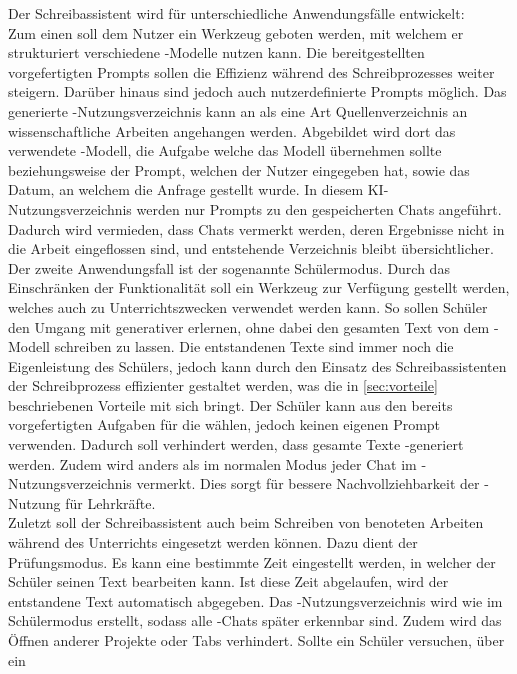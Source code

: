 \documentclass[../main.tex]{subfiles}
\begin{document}
Der Schreibassistent wird für unterschiedliche Anwendungsfälle entwickelt: \\
Zum einen soll dem Nutzer ein Werkzeug geboten werden, mit welchem er strukturiert verschiedene -Modelle nutzen kann. Die bereitgestellten vorgefertigten Prompts sollen die 
Effizienz während des Schreibprozesses weiter steigern. Darüber hinaus sind jedoch auch nutzerdefinierte Prompts möglich. Das generierte -Nutzungsverzeichnis kann an als eine Art 
Quellenverzeichnis an wissenschaftliche Arbeiten angehangen werden. Abgebildet wird dort das verwendete -Modell, die Aufgabe welche das Modell 
übernehmen sollte beziehungsweise der Prompt, welchen der Nutzer eingegeben hat, sowie das Datum, an welchem die Anfrage gestellt wurde. In diesem KI-Nutzungsverzeichnis werden nur 
Prompts zu den gespeicherten Chats angeführt. Dadurch wird vermieden, dass Chats vermerkt werden, deren Ergebnisse nicht in die Arbeit eingeflossen sind, und entstehende Verzeichnis 
bleibt übersichtlicher.\\ 
Der zweite Anwendungsfall ist der sogenannte Schülermodus. Durch das Einschränken der Funktionalität soll ein Werkzeug zur Verfügung gestellt werden, welches auch zu 
Unterrichtszwecken verwendet werden kann. So sollen Schüler den Umgang mit generativer  erlernen, ohne dabei den gesamten Text von dem -Modell schreiben zu lassen. Die 
entstandenen Texte sind immer noch die Eigenleistung des Schülers, jedoch kann durch den Einsatz des Schreibassistenten der Schreibprozess effizienter gestaltet werden, was die in 
\autoref{sec:vorteile} beschriebenen Vorteile mit sich bringt. Der Schüler kann aus den bereits vorgefertigten Aufgaben für die  wählen, jedoch keinen eigenen Prompt verwenden. Dadurch soll 
verhindert werden, dass gesamte Texte -generiert werden. Zudem wird anders als im normalen Modus jeder Chat im -Nutzungsverzeichnis vermerkt. Dies sorgt für bessere 
Nachvollziehbarkeit der -Nutzung für Lehrkräfte.\\ 
Zuletzt soll der Schreibassistent auch beim Schreiben von benoteten Arbeiten während des Unterrichts eingesetzt werden können. Dazu dient der Prüfungsmodus. Es kann eine bestimmte 
Zeit eingestellt werden, in welcher der Schüler seinen Text bearbeiten kann. Ist diese Zeit abgelaufen, wird der entstandene Text automatisch abgegeben. Das -Nutzungsverzeichnis 
wird wie im Schülermodus erstellt, sodass alle -Chats später erkennbar sind. Zudem wird das Öffnen anderer Projekte oder Tabs verhindert. Sollte ein Schüler versuchen, über ein 
\end{document}
